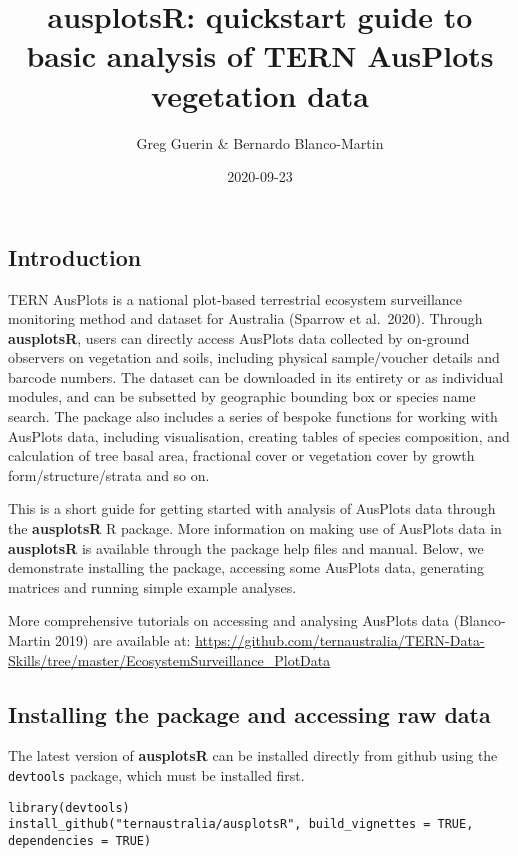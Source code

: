 \documentclass[
]{article}
\title{ausplotsR: quickstart guide to basic analysis of TERN AusPlots
vegetation data}
\author{Greg Guerin \& Bernardo Blanco-Martin}
\date{2020-09-23}
\begin{document}
\maketitle

\hypertarget{introduction}{%
\subsection{Introduction}\label{introduction}}

TERN AusPlots is a national plot-based terrestrial ecosystem
surveillance monitoring method and dataset for Australia (Sparrow et
al.~2020). Through \textbf{ausplotsR}, users can directly access
AusPlots data collected by on-ground observers on vegetation and soils,
including physical sample/voucher details and barcode numbers. The
dataset can be downloaded in its entirety or as individual modules, and
can be subsetted by geographic bounding box or species name search. The
package also includes a series of bespoke functions for working with
AusPlots data, including visualisation, creating tables of species
composition, and calculation of tree basal area, fractional cover or
vegetation cover by growth form/structure/strata and so on.

This is a short guide for getting started with analysis of AusPlots data
through the \textbf{ausplotsR} R package. More information on making use
of AusPlots data in \textbf{ausplotsR} is available through the package
help files and manual. Below, we demonstrate installing the package,
accessing some AusPlots data, generating matrices and running simple
example analyses.

More comprehensive tutorials on accessing and analysing AusPlots data
(Blanco-Martin 2019) are available at:
\url{https://github.com/ternaustralia/TERN-Data-Skills/tree/master/EcosystemSurveillance_PlotData}

\hypertarget{installing-the-package-and-accessing-raw-data}{%
\subsection{Installing the package and accessing raw
data}\label{installing-the-package-and-accessing-raw-data}}

The latest version of \textbf{ausplotsR} can be installed directly from
github using the \texttt{devtools} package, which must be installed
first.

\begin{verbatim}
library(devtools)
install_github("ternaustralia/ausplotsR", build_vignettes = TRUE, dependencies = TRUE)
\end{verbatim}
\end{document}
